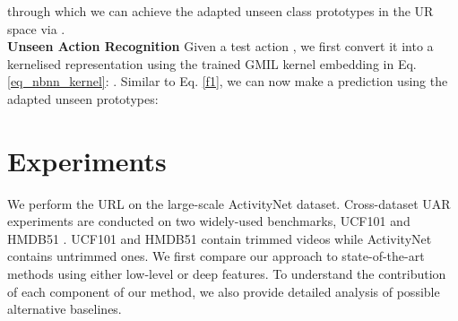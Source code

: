 \documentclass[10pt,twocolumn,letterpaper]{article}
\begin{document}
through which we can achieve the adapted unseen class prototypes  in the UR space via .\\

\noindent\textbf{Unseen Action Recognition} Given a test action , we first convert it into a kernelised representation using the trained GMIL kernel embedding in Eq. \ref{eq_nbnn_kernel}: . Similar to Eq. \ref{f1}, we can now make a prediction using the adapted unseen prototypes:


\section{Experiments}
We perform the URL on the large-scale ActivityNet \cite{activityNet} dataset. Cross-dataset UAR experiments are conducted on two widely-used benchmarks, UCF101 \cite{ucf101} and HMDB51 \cite{hmdb51}. UCF101 and HMDB51 contain trimmed videos while ActivityNet contains untrimmed ones. We first compare our approach to state-of-the-art methods using either low-level or deep features. To understand the contribution of each component of our method, we also provide detailed analysis of possible alternative baselines.

\begin{table}[]
	\centering

	\caption{Comparison with state-of-the-art methods using standard low-level features. Last two sets of results are just for reference. T: transductive; I: inductive; Results are in \%.}
\label{tab_stat}
\vspace{-2ex}
\end{table}
\end{document}
